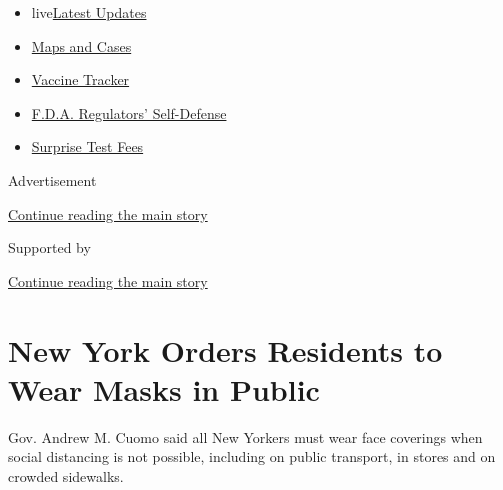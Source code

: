 \begin{itemize}
\tightlist
\item
  live\href{https://www.nytimes3xbfgragh.onion/2020/09/11/world/covid-19-coronavirus.html?name=styln-coronavirus-national\&region=TOP_BANNER\&block=storyline_menu_recirc\&action=click\&pgtype=Article\&impression_id=d5808a01-f4cf-11ea-b203-1d02d46fa2b1\&variant=undefined}{Latest
  Updates}
\item
  \href{https://www.nytimes3xbfgragh.onion/interactive/2020/us/coronavirus-us-cases.html?name=styln-coronavirus-national\&region=TOP_BANNER\&block=storyline_menu_recirc\&action=click\&pgtype=Article\&impression_id=d580b110-f4cf-11ea-b203-1d02d46fa2b1\&variant=undefined}{Maps
  and Cases}
\item
  \href{https://www.nytimes3xbfgragh.onion/interactive/2020/science/coronavirus-vaccine-tracker.html?name=styln-coronavirus-national\&region=TOP_BANNER\&block=storyline_menu_recirc\&action=click\&pgtype=Article\&impression_id=d580b111-f4cf-11ea-b203-1d02d46fa2b1\&variant=undefined}{Vaccine
  Tracker}
\item
  \href{https://www.nytimes3xbfgragh.onion/2020/09/10/us/politics/fda-coronavirus-vaccine.html?name=styln-coronavirus-national\&region=TOP_BANNER\&block=storyline_menu_recirc\&action=click\&pgtype=Article\&impression_id=d580b112-f4cf-11ea-b203-1d02d46fa2b1\&variant=undefined}{F.D.A.
  Regulators' Self-Defense}
\item
  \href{https://www.nytimes3xbfgragh.onion/2020/09/09/upshot/coronavirus-surprise-test-fees.html?name=styln-coronavirus-national\&region=TOP_BANNER\&block=storyline_menu_recirc\&action=click\&pgtype=Article\&impression_id=d580b113-f4cf-11ea-b203-1d02d46fa2b1\&variant=undefined}{Surprise
  Test Fees}
\end{itemize}

Advertisement

\protect\hyperlink{after-top}{Continue reading the main story}

Supported by

\protect\hyperlink{after-sponsor}{Continue reading the main story}

\hypertarget{new-york-orders-residents-to-wear-masks-in-public}{%
\section{New York Orders Residents to Wear Masks in
Public}\label{new-york-orders-residents-to-wear-masks-in-public}}

Gov. Andrew M. Cuomo said all New Yorkers must wear face coverings when
social distancing is not possible, including on public transport, in
stores and on crowded sidewalks.

